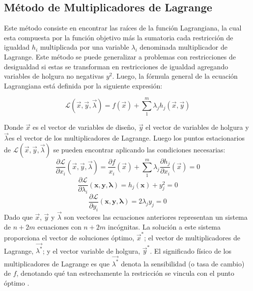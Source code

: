 \subsection{Método de Multiplicadores de Lagrange}
Este método consiste en encontrar las raíces de la función Lagrangiana, la cual esta compuesta por la función objetivo más la sumatoria cada restricción de igualdad $h_i$ multiplicada por una variable $\lambda_i$ denominada multiplicador de Lagrange. Este método se puede generalizar a problemas con restricciones de desigualdad si estas se transforman en restricciones de igualdad agregando variables de holgura no negativas $y^2$. Luego, la fórmula general de la ecuación Lagrangiana está definida por la siguiente expresión:

\begin{equation}
\mathcal{L} (\vec{x},\vec{y},\vec{\lambda})=f(\vec{x})+ \sum_{1}^m \lambda_j h_j(\vec{x},\vec{y})
\end{equation}

Donde $\vec{x}$ es el vector de variables de diseño, $\vec{y}$ el vector de variables de holgura y $\vec{\lambda}$es el vector de los multiplicadores de Lagrange. Luego los puntos estacionarios de $\mathcal{L} (\vec{x},\vec{y},\vec{\lambda})$ se pueden encontrar aplicando las condiciones necesarias:
\begin{equation}
\frac{\partial \mathcal{L}}{\partial x_i} (\vec{x},\vec{y},\vec{\lambda})=\frac{\partial f}{x_i}(\vec{x})+ \sum_{1}^m \lambda_j \frac{\partial h_j}{\partial x_i} (\vec{x})=0
\end{equation}
\begin{equation}
\frac{\partial \mathcal{L}}{\partial \lambda_i} (\textbf{x},\textbf{y},\boldsymbol{\lambda})= h_j(\textbf{x})+y^2_j=0 
\end{equation}
\begin{equation}
\frac{\partial \mathcal{L}}{\partial y_i} (\textbf{x},\textbf{y},\boldsymbol{\lambda})=2 \lambda_j y_j=0
\end{equation}
Dado que $\vec{x}$, $\vec{y}$ y $\vec{\lambda}$ son vectores las ecuaciones anteriores representan un sistema de $n+2m$ ecuaciones con $n+2m$ incógnitas. La solución a este sistema proporciona  el vector de soluciones óptimo, $\vec{x}^*$; el vector de multiplicadores de Lagrange, $\vec{\lambda^*}$; y el vector variable de holgura, $\vec{y}^*$. El significado físico de los multiplicadores de Lagrange es que $\vec{\lambda^*}$ denota la sensibilidad (o tasa de cambio) de $f$, denotando qué tan estrechamente la restricción se vincula con el punto óptimo \cite{rao_engineering_2009}.


